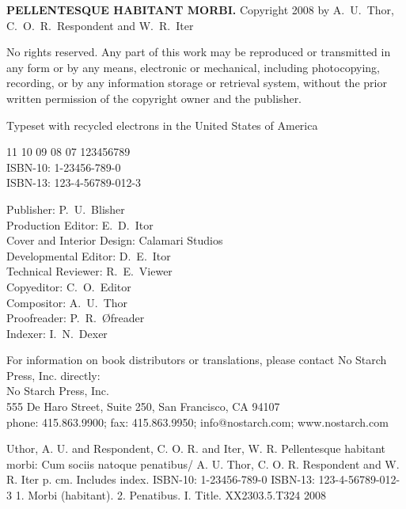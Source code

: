 \makehalftitle

\maketitle


\begin{copyrightpage}
  \textbf{\sffamily\MakeUppercase{Pellentesque habitant morbi.}}
  Copyright \textcopyright{} 2008 by A.~U.~Thor, C.~O.~R.~Respondent
  and W.~R.~Iter

  No rights reserved. Any part of this work may be reproduced or
  transmitted in any form or by any means, electronic or mechanical,
  including photocopying, recording, or by any information storage or
  retrieval system, without the prior written permission of the
  copyright owner and the publisher.

   Typeset
  with recycled electrons in the United States of America

11 10 09 08 07 \hspace{0.5in}  123456789\\
ISBN-10: 1-23456-789-0\\
ISBN-13: 123-4-56789-012-3

Publisher: P.~U.~Blisher\\
Production Editor: E.~D.~Itor\\
Cover and Interior Design: Calamari Studios\\
Developmental Editor: D.~E.~Itor\\
Technical Reviewer: R.~E.~Viewer\\
Copyeditor: C.~O.~Editor\\
Compositor: A.~U.~Thor\\
Proofreader: P.~R.~\O freader\\
Indexer: I.~N.~Dexer

For information on book distributors or translations, please contact
No Starch Press, Inc. directly: \\
No Starch Press, Inc.\\
555 De Haro Street, Suite 250, San Francisco, CA 94107\\
phone: 415.863.9900; fax: 415.863.9950; info@nostarch.com; www.nostarch.com\\

\begin{cipblock}
Uthor, A. U. and Respondent, C. O. R. and Iter, W. R.
  Pellentesque habitant morbi: Cum sociis natoque penatibus/
  A. U. Thor, C. O. R. Respondent and W. R. Iter
       p. cm.
  Includes index.
  ISBN-10: 1-23456-789-0
  ISBN-13: 123-4-56789-012-3
  1.  Morbi (habitant).  2. Penatibus. I. Title.
XX2303.5.T324 2008
\end{cipblock}


\end{copyrightpage}
